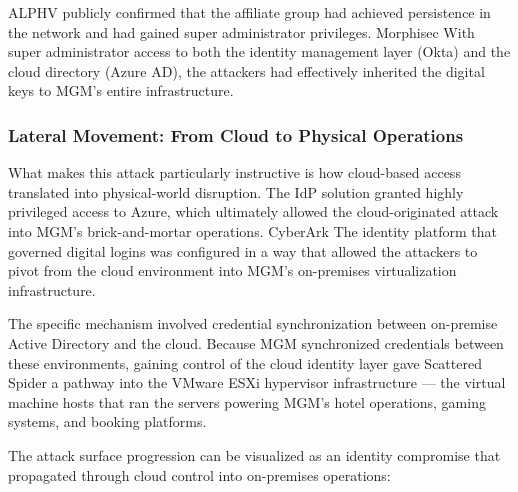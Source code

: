 ALPHV publicly confirmed that the affiliate group had achieved persistence in the network and had gained super administrator privileges. Morphisec With super administrator access to both the identity management layer (Okta) and the cloud directory (Azure AD), the attackers had effectively inherited the digital keys to MGM's entire infrastructure.

\subsubsection{Lateral Movement: From Cloud to Physical Operations}

What makes this attack particularly instructive is how cloud-based access translated into physical-world disruption. The IdP solution granted highly privileged access to Azure, which ultimately allowed the cloud-originated attack into MGM's brick-and-mortar operations. CyberArk The identity platform that governed digital logins was configured in a way that allowed the attackers to pivot from the cloud environment into MGM's on-premises virtualization infrastructure.

The specific mechanism involved credential synchronization between on-premise Active Directory and the cloud. Because MGM synchronized credentials between these environments, gaining control of the cloud identity layer gave Scattered Spider a pathway into the VMware ESXi hypervisor infrastructure — the virtual machine hosts that ran the servers powering MGM's hotel operations, gaming systems, and booking platforms.

The attack surface progression can be visualized as an identity compromise that propagated through cloud control into on-premises operations:

